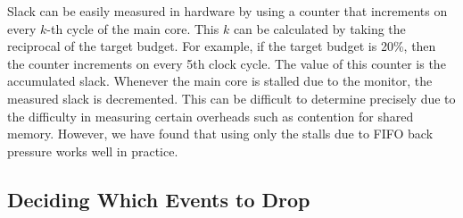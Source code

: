 
Slack can be easily measured in hardware by using a counter that increments on every $k$-th
cycle of the main core. This $k$ can be calculated by taking the reciprocal of
the target budget. For example, if the target budget is 20\%, then the counter
increments on every 5th clock cycle. The value of this counter is the
accumulated slack. Whenever the main core is stalled due to the monitor, the measured slack
is decremented. This can be difficult to determine precisely due to the
difficulty in measuring certain overheads such as contention for shared memory.
However, we have found that using only the stalls due to FIFO back pressure
works well in practice.

\subsection{Deciding Which Events to Drop} 
\label{sec:policies.which}

